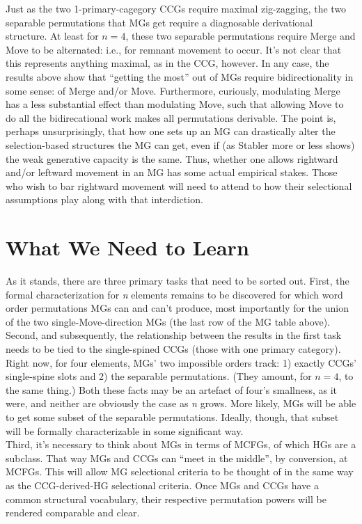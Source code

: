 \documentclass[12pt]{article}
\begin{document}
\noindent Just as the two 1-primary-cagegory CCGs require maximal zig-zagging, the two separable permutations that MGs get require a diagnosable derivational structure. At least for $n=4$, these two separable permutations require Merge and Move to be alternated: i.e., for remnant movement to occur. It's not clear that this represents anything maximal, as in the CCG, however. In any case, the results above show that ``getting the most'' out of MGs require bidirectionality in some sense: of Merge and/or Move. Furthermore, curiously, modulating Merge has a less substantial effect than modulating Move, such that allowing Move to do all the bidirecational work makes all permutations derivable. The point is, perhaps unsurprisingly, that how one sets up an MG can drastically alter the selection-based structures the MG can get, even if (as Stabler more or less shows) the weak generative capacity is the same. Thus, whether one allows rightward and/or leftward movement in an MG has some actual empirical stakes. Those who wish to bar rightward movement will need to attend to how their selectional assumptions play along with that interdiction.

\section{What We Need to Learn}

\noindent As it stands, there are three primary tasks that need to be sorted out. First, the formal characterization for \textit{n} elements remains to be discovered for which word order permutations MGs can and can't produce, most importantly for the union of the two single-Move-direction MGs (the last row of the MG table above). \\

\noindent Second, and subsequently, the relationship between the results in the first task needs to be tied to the single-spined CCGs (those with one primary category). Right now, for four elements, MGs' two impossible orders track: 1) exactly CCGs' single-spine slots and 2) the separable permutations. (They amount, for $n=4$, to the same thing.) Both these facts may be an artefact of four's smallness, as it were, and neither are obviously the case as \textit{n} grows. More likely, MGs will be able to get some subset of the separable permutations. Ideally, though, that subset will be formally characterizable in some significant way.\\

\noindent Third, it's necessary to think about MGs in terms of MCFGs, of which HGs are a subclass. That way MGs and CCGs can ``meet in the middle'', by conversion, at MCFGs. This will allow MG selectional criteria to be thought of in the same way as the CCG-derived-HG selectional criteria. Once MGs and CCGs have a common structural vocabulary, their respective permutation powers will be rendered comparable and clear.\\
\end{document}
